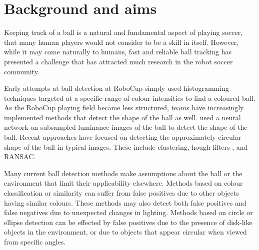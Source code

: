 \documentclass[11pt]{scrartcl}
\begin{document}
	\section{Background and aims} {

  		Keeping track of a ball is a natural and fundamental aspect of playing 
  		soccer, that many human players would not consider to be a skill in itself. 
  		However, while it may come naturally to humans, fast and reliable ball
        tracking has presented a challenge that has attracted much research in
        the robot soccer community.
        

        Early attempts at ball detection at RoboCup simply used histogramming
        techniques targeted at a specific range of colour intensities to find
        a coloured ball. As the RoboCup playing field became less structured,
        teams have increasingly implemented methods that detect the shape of
        the ball as well.
        \citet{schulz2007ball} used a neural network on
        subsampled luminance images of the ball to detect the shape of the 
        ball. Recent approaches have focused on detecting the approximately
        circular shape of the ball in typical images. These include
        clustering, hough filters \citet{li2013survey}, and RANSAC.


        Many current ball detection methods make assumptions about the ball or
        the environment that limit their applicability elsewhere. Methods
        based on colour classification or similarity can suffer from false
        positives due to other objects having similar colours. These methods may 
        also detect both false positives and false negatives due to unexpected changes
        in lighting. Methods based on circle or ellipse detection can be effected by
        false positives due to the presence of disk-like objects in the
        environment, or due to objects that appear circular when viewed from
        specific angles.

}
\end{document}
